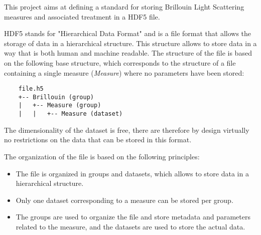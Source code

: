 This project aims at defining a standard for storing Brillouin Light Scattering measures and associated treatment in a HDF5 file.

HDF5 stands for "Hierarchical Data Format" and is a file format that allows the storage of data in a hierarchical structure. This structure allows to store data in a way that is both human and machine readable. The structure of the file is based on the following base structure, which corresponds to the structure of a file containing a single measure (\textit{Measure}) where no parameters have been stored:

\begin{verbatim}
    file.h5
    +-- Brillouin (group)
    |   +-- Measure (group)
    |   |   +-- Measure (dataset)
\end{verbatim}

The dimensionality of the dataset is free, there are therefore by design virtually no restrictions on the data that can be stored in this format.

The organization of the file is based on the following principles:
\begin{itemize}
    \item The file is organized in groups and datasets, which allows to store data in a hierarchical structure.
    \item Only one dataset corresponding to a measure can be stored per group. 
    \item The groups are used to organize the file and store metadata and parameters related to the measure, and the datasets are used to store the actual data.
\end{itemize}